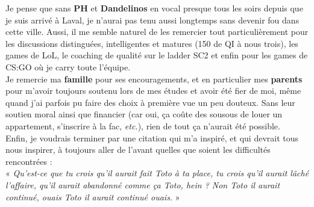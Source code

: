 Je pense que sans \textbf{PH} et \textbf{Dandelinos} en vocal presque tous les soirs depuis que je suis arrivé à Laval, je n'aurai pas tenu aussi longtemps sans devenir fou dans cette ville. Aussi, il me semble naturel de les remercier tout particulièrement pour les discussions distinguées, intelligentes et matures (150 de QI à nous trois), les games de LoL, le coaching de qualité sur le ladder SC2 et enfin pour les games de CS{\string:}GO où je carry toute l'équipe.\\


Je remercie ma \textbf{famille} pour ses encouragements, et en particulier mes \textbf{parents} pour m'avoir toujours soutenu lors de mes études et avoir été fier de moi, même quand j'ai parfois pu faire des choix à première vue un peu douteux. Sans leur soutien moral ainsi que financier (car oui, ça coûte des sousous de louer un appartement, s'inscrire à la fac, \textit{etc.}), rien de tout ça n'aurait été possible.\\

\vspace{0.5cm}
Enfin, je voudrais terminer par une citation qui m'a inspiré, et qui devrait tous nous inspirer, à toujours aller de l'avant quelles que soient les difficultés rencontrées :
\vspace{0.25cm}\\
« \textit{Qu'est-ce que tu crois qu'il aurait fait Toto à ta place, tu crois qu'il aurait lâché l'affaire, qu'il aurait abandonné comme ça Toto, hein ? Non Toto il aurait continué, ouais Toto il aurait continué ouais.} »